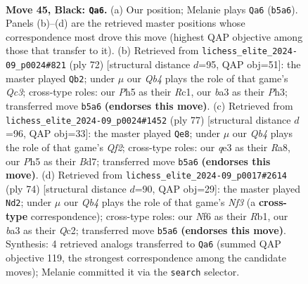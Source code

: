 \documentclass[11pt]{article}
\begin{document}
\begin{figure}[p]
\label{fig:thought-m87}
\end{figure}

\clearpage

\begin{figure}[p]\centering
\begin{subfigure}{0.46\textwidth}\centering
\resizebox{\linewidth}{!}{%
\newchessgame
\chessboard[
  setfen={r1b3k1/p1p2pp1/1p3n2/1q5p/5P1b/BP2Q2P/P1B3PK/R7 b - - 3 45},
  showmover=false,
  pgfstyle=straightmove, color=movearrow, markmove={b5-a6}
]}
\caption{}
\end{subfigure}\hfill
\begin{subfigure}{0.46\textwidth}\centering
\resizebox{\linewidth}{!}{%
\newchessgame
\chessboard[
  setfen={8/p2nqp1k/P1b3p1/2p3r1/5N1p/2Q1P2P/5PP1/2R2BK1 w - - 9 37},
  showmover=false,
  pgfstyle=straightmove, color=movearrow, markmove={c3-b2}
]}
\caption{}
\end{subfigure}
\\[4pt]
\begin{subfigure}{0.46\textwidth}\centering
\resizebox{\linewidth}{!}{%
\newchessgame
\chessboard[
  setfen={r6k/2pb1qp1/3p3p/PpnP1p2/5P2/4PBPP/2NQ3K/6R1 b - - 16 39},
  showmover=false,
  pgfstyle=straightmove, color=movearrow, markmove={f7-e8}
]}
\caption{}
\end{subfigure}\hfill
\begin{subfigure}{0.46\textwidth}\centering
\resizebox{\linewidth}{!}{%
\newchessgame
\chessboard[
  setfen={r4bk1/2q3p1/2b2p1p/p3p3/P1P5/2B1PN1P/2Q2PP1/1R4K1 w - - 3 38},
  showmover=false,
  pgfstyle=straightmove, color=movearrow, markmove={f3-d2}
]}
\caption{}
\end{subfigure}
\caption{\textbf{Move 45, Black: \texttt{Qa6}.} (a) Our position; Melanie plays \texttt{Qa6} (\texttt{b5a6}). Panels (b)--(d) are the retrieved master positions whose correspondence most drove this move (highest QAP objective among those that transfer to it). (b) Retrieved from \texttt{lichess\_elite\_2024-09\_p0024\#821} (ply 72) [structural distance $d$=95, QAP obj=51]: the master played \texttt{Qb2}; under $\mu$ our \emph{Qb4} plays the role of that game's \emph{Qc3}; cross-type roles: our \emph{P}h5 as their \emph{R}c1, our \emph{b}a3 as their \emph{P}h3; transferred move \texttt{b5a6} \textbf{(endorses this move)}. (c) Retrieved from \texttt{lichess\_elite\_2024-09\_p0024\#1452} (ply 77) [structural distance $d$=96, QAP obj=33]: the master played \texttt{Qe8}; under $\mu$ our \emph{Qb4} plays the role of that game's \emph{Qf2}; cross-type roles: our \emph{q}e3 as their \emph{R}a8, our \emph{P}h5 as their \emph{B}d7; transferred move \texttt{b5a6} \textbf{(endorses this move)}. (d) Retrieved from \texttt{lichess\_elite\_2024-09\_p0017\#2614} (ply 74) [structural distance $d$=90, QAP obj=29]: the master played \texttt{Nd2}; under $\mu$ our \emph{Qb4} plays the role of that game's \emph{Nf3} (a \textbf{cross-type} correspondence); cross-type roles: our \emph{N}f6 as their \emph{R}b1, our \emph{b}a3 as their \emph{Q}c2; transferred move \texttt{b5a6} \textbf{(endorses this move)}. Synthesis: 4 retrieved analogs transferred to \texttt{Qa6} (summed QAP objective 119, the strongest correspondence among the candidate moves); Melanie committed it via the \texttt{search} selector.}

\end{figure}
\end{document}
